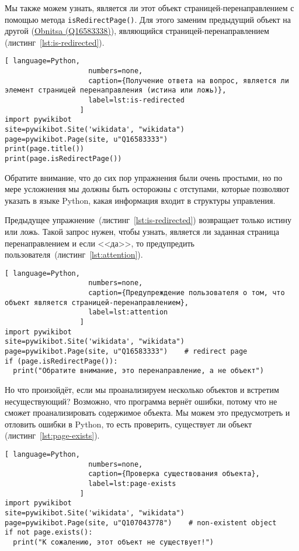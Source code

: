 Мы также можем узнать, является ли этот объект страницей-перенаправлением
с помощью метода \lstinline|isRedirectPage()|. 
Для этого заменим предыдущий объект на другой 
(\href{https://www.wikidata.org/w/index.php?title=Q16583333&redirect=no}{Obnitsa (Q16583338)}),
являющийся страницей-перенаправлением (листинг~\ref{lst:is-redirected}).

\begin{lstlisting}[ language=Python,
                    numbers=none,
                    caption={Получение ответа на вопрос, является ли элемент страницей перенаправления (истина или ложь)},
                    label=lst:is-redirected
                  ]
import pywikibot
site=pywikibot.Site('wikidata', "wikidata")
page=pywikibot.Page(site, u"Q16583333")
print(page.title())
print(page.isRedirectPage())
\end{lstlisting}

Обратите внимание, что до сих пор упражнения были очень простыми, но по мере усложнения мы должны быть осторожны с отступами, которые позволяют указать в языке Python, какая информация входит в структуры управления.

Предыдущее упражнение~(листинг~\ref{lst:is-redirected}) возвращает только истину или ложь. 
Такой запрос нужен, чтобы узнать, является ли заданная страница перенаправлением и если <<да>>, 
то предупредить пользователя~(листинг~\ref{lst:attention}).

\begin{lstlisting}[ language=Python,
                    numbers=none,
                    caption={Предупреждение пользователя о том, что объект является страницей-перенаправлением},
                    label=lst:attention
                  ]
import pywikibot
site=pywikibot.Site('wikidata', "wikidata")
page=pywikibot.Page(site, u"Q16583333")    # redirect page
if (page.isRedirectPage()):
  print("Обратите внимание, это перенаправление, а не объект")
\end{lstlisting}

Но что произойдёт, если мы проанализируем несколько объектов и встретим несуществующий? 
Возможно, что программа вернёт ошибки, потому что не сможет проанализировать содержимое объекта. 
Мы можем это предусмотреть и отловить ошибки в Python, то есть проверить, существует ли объект (листинг~\ref{lst:page-exists}).

\begin{lstlisting}[ language=Python,
                    numbers=none,
                    caption={Проверка существования объекта},
                    label=lst:page-exists
                  ]
import pywikibot
site=pywikibot.Site('wikidata', "wikidata")
page=pywikibot.Page(site, u"Q107043778")    # non-existent object
if not page.exists():
  print("К сожалению, этот объект не существует!")
\end{lstlisting}


